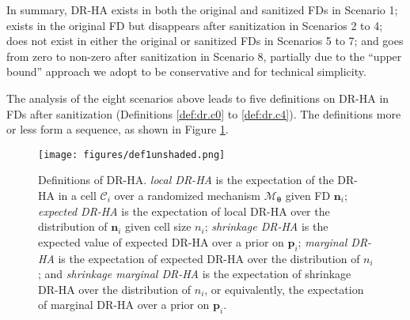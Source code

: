 \documentclass[10pt,journal,compsoc]{IEEEtran}
\newcommand{\M}{\mathcal{M}}
\newcommand{\p}{\mathbf{p}}
\newcommand{\n}{\mathbf{n}}
\newcommand{\C}{\mathcal{C}}
\newcommand{\bs}{\boldsymbol}
\begin{document}
In summary, DR-HA exists in both the original and sanitized FDs in Scenario 1; exists in the original FD but disappears after sanitization in Scenarios 2 to 4; does not exist in either the original or sanitized FDs in Scenarios 5 to 7; and goes from zero to non-zero after sanitization in Scenario 8, partially due to the ``upper bound'' approach we adopt to be conservative and for technical simplicity.  

The analysis of the eight scenarios above leads to five definitions on DR-HA in FDs after  sanitization (Definitions \ref{def:dr.c0} to \ref{def:dr.c4}). The definitions more or less form a sequence, as shown in Figure \ref{fig:def}.
\begin{figure}[!htb]
\vspace{-12pt}\centering
\texttt{[image: figures/def1unshaded.png]} \vspace{-3pt}
\caption{Definitions of DR-HA.  \emph{local DR-HA} is the expectation of the DR-HA in a cell $\C_i$ over a randomized mechanism $\M_{\bs{\theta}}$ given FD $\n_i$;  \emph{expected DR-HA} is the expectation of local DR-HA over the distribution of $\n_i$ given cell size $n_i$;  \emph{shrinkage DR-HA}  is the expected value of expected DR-HA over a prior on $\p_i$; \emph{marginal DR-HA} is the expectation of expected DR-HA over the distribution of $n_i$; and \emph{shrinkage marginal DR-HA} is the expectation of shrinkage DR-HA over the distribution of $n_i$, or equivalently, the expectation of marginal DR-HA over a prior  on $\p_i$.}\label{fig:def} \vspace{-12pt}  
\end{figure} 
\end{document}
